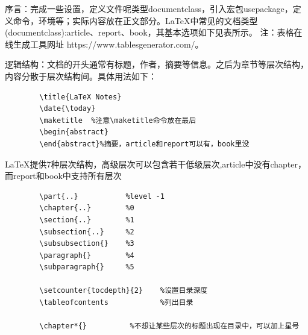 \documentclass[16pt]{article}
\begin{document}
序言：完成一些设置，定义文件呢类型documentclass，引入宏包usepackage，定义命令，环境等；实际内容放在正文部分。\LaTeX{}中常见的文档类型(documentclass):article、report、book，其基本选项如下见表所示。
注：表格在线生成工具网址 https://www.tablesgenerator.com/。
\par
逻辑结构：文档的开头通常有标题，作者，摘要等信息。之后为章节等层次结构，内容分散于层次结构间。具体用法如下：
\par
\begin{lstlisting}
        \title{LaTeX Notes}
        \date{\today}
        \maketitle  %注意\maketitle命令放在最后
        \begin{abstract}
        \end{abstract}%摘要，article和report可以有，book里没
    \end{lstlisting}
\par
\LaTeX{}提供7种层次结构，高级层次可以包含若干低级层次,article中没有chapter，而report和book中支持所有层次
\begin{lstlisting}
        \part{..}           %level -1
        \chapter{..}        %0
        \section{..}        %1
        \subsection{..}     %2
        \subsubsection{}    %3
        \paragraph{}        %4
        \subparagraph{}     %5

        \setcounter{tocdepth}{2}    %设置目录深度
        \tableofcontents            %列出目录

        \chapter*{}          %不想让某些层次的标题出现在目录中，可以加上星号
    \end{lstlisting}
\end{document}
